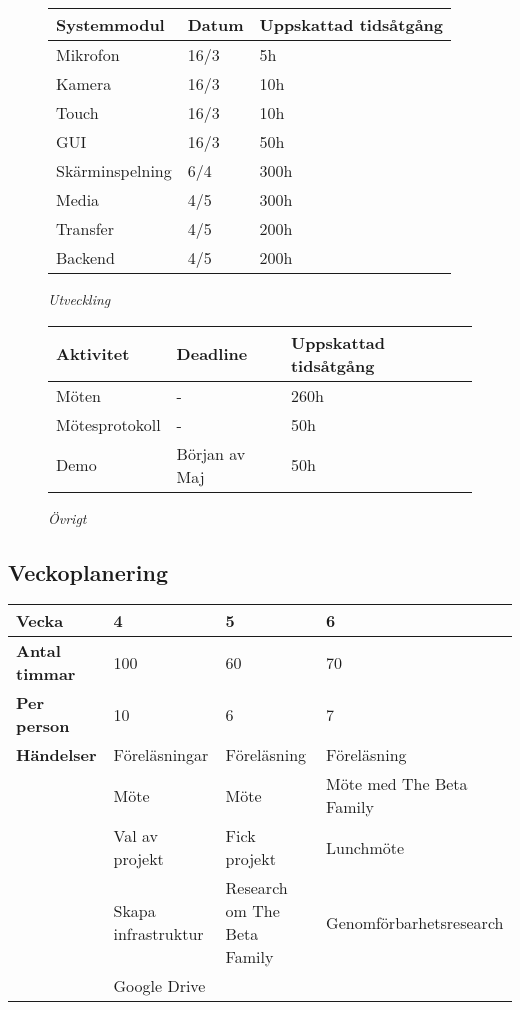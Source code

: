 \begin{figure}[H]
\centering
\begin{tabular}{ | l | l | l |}
  \hline
  \textbf{Systemmodul} & \textbf{Datum} & \textbf{Uppskattad tidsåtgång} \\ \hline
  Mikrofon & 16/3 & 5h \\ \hline
  Kamera & 16/3 & 10h  \\ \hline
  Touch & 16/3 & 10h \\ \hline
  GUI & 16/3 & 50h \\ \hline
  Skärminspelning & 6/4 & 300h \\ \hline
  Media & 4/5 & 300h \\ \hline
  Transfer & 4/5 & 200h \\ \hline
  Backend & 4/5 & 200h \\ \hline
\end{tabular}
\caption*{\textit{Utveckling}}
\end{figure}

\begin{figure}[H]
\centering
\begin{tabular}{ | l | l | l | }
  \hline
  \textbf{Aktivitet} & \textbf{Deadline} & \textbf{Uppskattad tidsåtgång} \\ \hline
  Möten & - & 260h \\ \hline
  Mötesprotokoll & - & 50h \\ \hline
  Demo & Början av Maj & 50h \\ \hline
\end{tabular}
\caption*{\textit{Övrigt}}
\end{figure}

\subsection{Veckoplanering}

\begin{tabular}{ | p{65pt} || p{110pt} | p{110pt} | p{110pt} |}
  \hline
  \textbf{Vecka} & 4 & 5 & 6 \\ \hline
  \textbf{Antal timmar} & 100 & 60 & 70 \\ \hline
  \textbf{Per person} & 10 & 6 & 7 \\ \hline
  \textbf{Händelser} & Föreläsningar & Föreläsning & Föreläsning \\ \hline
  & Möte & Möte & Möte med The Beta Family  \\ \hline
  & Val av projekt & Fick projekt & Lunchmöte\\ \hline
  & Skapa infrastruktur & Research om The Beta Family & Genomförbarhetsresearch\\ \hline
  & Google Drive &  & \\ \hline
\end{tabular}

